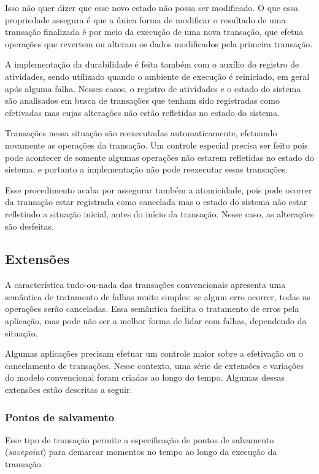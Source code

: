 \documentclass[11pt,twoside,a4paper]{book}
\begin{document}
Isso não quer dizer que esse novo estado não possa ser modificado. O que essa propriedade assegura é que a única forma de modificar o resultado de uma transação finalizada é por meio da execução de uma nova transação, que efetua operações que revertem ou alteram os dados modificados pela primeira transação.

A implementação da durabilidade é feita também com o auxílio do registro de atividades, sendo utilizado quando o ambiente de execução é reiniciado, em geral após alguma falha. Nesses casos, o registro de atividades e o estado do sistema são analisados em busca de transações que tenham sido registradas como efetivadas mas cujas alterações não estão refletidas no estado do sistema.

Transações nessa situação são reexecutadas automaticamente, efetuando novamente as operações da transação. Um controle especial precisa ser feito pois pode acontecer de somente algumas operações não estarem refletidas no estado do sistema, e portanto a implementação não pode reexecutar essas transações.

Esse procedimento acaba por assegurar também a atomicidade, pois pode ocorrer da transação estar registrada como cancelada mas o estado do sistema não estar refletindo a situação inicial, antes do início da transação. Nesse caso, as alterações são desfeitas.

\subsection{Extensões}
\label{subsec:extensoes}
A característica tudo-ou-nada das transações convencionais apresenta uma semântica de tratamento de falhas muito simples: se algum erro ocorrer, todas as operações serão canceladas. Essa semântica facilita o tratamento de erros pela aplicação, mas pode não ser a melhor forma de lidar com falhas, dependendo da situação.

Algumas aplicações precisam efetuar um controle maior sobre a efetivação ou o cancelamento de transações. Nesse contexto, uma série de extensões e variações do modelo convencional foram criadas ao longo do tempo. Algumas dessas extensões estão descritas a seguir.

\subsubsection*{Pontos de salvamento}
Esse tipo de transação permite a especificação de pontos de salvamento (\emph{savepoint}) para demarcar momentos no tempo ao longo da execução da transação.
\end{document}

